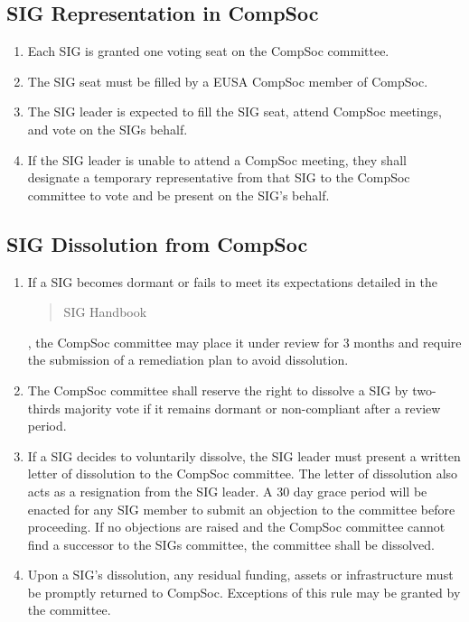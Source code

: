 \subsection{SIG Representation in CompSoc}
\begin{enumerate}
    \item Each SIG is granted one voting seat on the CompSoc committee.
    \item The SIG seat must be filled by a EUSA CompSoc member of CompSoc.
    \item The SIG leader is expected to fill the SIG seat, attend CompSoc meetings, and vote on the SIGs behalf.
    \item If the SIG leader is unable to attend a CompSoc meeting, they shall designate a temporary representative from that SIG to the CompSoc committee to vote and be present on the SIG's behalf.
\end{enumerate}

\subsection{SIG Dissolution from CompSoc}
\begin{enumerate}
    \item If a SIG becomes dormant or fails to meet its expectations detailed in the \blockquote{SIG Handbook}, the CompSoc committee may place it under review for 3 months and require the submission of a remediation plan to avoid dissolution.
    \item The CompSoc committee shall reserve the right to dissolve a SIG by two-thirds majority vote if it remains dormant or non-compliant after a review period.
    \item If a SIG decides to voluntarily dissolve, the SIG leader must present a written letter of dissolution to the CompSoc committee. The letter of dissolution also acts as a resignation from the SIG leader. A 30 day grace period will be enacted for any SIG member to submit an objection to the committee before proceeding. If no objections are raised and the CompSoc committee cannot find a successor to the SIGs committee, the committee shall be dissolved.
    \item Upon a SIG's dissolution, any residual funding, assets or infrastructure must be promptly returned to CompSoc. Exceptions of this rule may be granted by the committee.
\end{enumerate}

